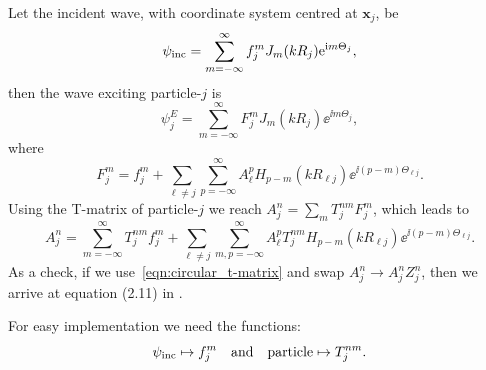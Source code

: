 \documentclass[ 12pt, a4paper]{article}
\renewcommand{\vec}[1]{\boldsymbol{#1}}
\begin{document}
Let the incident wave, with coordinate system centred at $\vec x_j$, be
\begin{equation}
  \label{eqn:incident}
  \psi_{\mathrm{inc}} = \sum_{m=-\infty}^\infty f^m_j J_{m}(k R_j) \mathrm{e}^{\mathrm{i} m \Theta_j},
\end{equation}
then the wave exciting particle-$j$ is
\begin{equation}
  \label{eqn:exciter}
  \psi_j^E = \sum_{m=-\infty}^\infty F^m_j J_m(k R_j) \ee^{\ii m \Theta_j},
\end{equation}
where
\begin{equation}
  F^m_j = f^m_j + \sum_{\ell\not = j} \sum_{p=-\infty}^\infty A_\ell^p H_{p-m}(k R_{\ell j})\ee^{\ii(p-m)\Theta_{\ell j}}.
\end{equation}
Using the T-matrix of particle-$j$ we reach $A_j^n = \sum_m T^{nm}_j F^m_j$, which leads to
\begin{equation}
A_j^n  = \sum_{m=-\infty}^\infty T^{nm}_j f^m_j + \sum_{\ell\not = j} \sum_{m,p=-\infty}^\infty A_\ell^p T^{nm}_j H_{p-m}(k R_{\ell j})\ee^{\ii(p-m)\Theta_{\ell j}}.
\label{eqn:As}
\end{equation}
As a check, if we use~\eqref{eqn:circular_t-matrix} and swap $A_j^n \to A_j^n Z^n_j$, then we arrive at equation (2.11) in \cite{gower_reflection_2017}.

For easy implementation we need the functions:
\[
\psi_{\mathrm{inc}} \mapsto f^m_j \quad \text{and} \quad \text{particle} \mapsto T^{nm}_j.
\]
\end{document}
